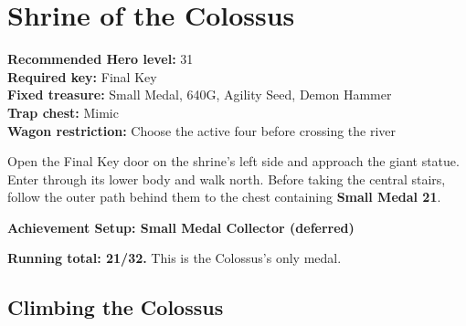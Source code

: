 \documentclass[
  american,
  10pt,
  letterpaper,
  oneside,
  open=any]{scrreprt}
\begin{document}
\section{Shrine of the Colossus}\label{shrine-of-the-colossus}

\textbf{Recommended Hero level:} 31\\
\textbf{Required key:} Final Key\\
\textbf{Fixed treasure:} Small Medal, 640G, Agility Seed, Demon Hammer\\
\textbf{Trap chest:} Mimic\\
\textbf{Wagon restriction:} Choose the active four before crossing the
river

Open the Final Key door on the shrine's left side and approach the giant
statue. Enter through its lower body and walk north. Before taking the
central stairs, follow the outer path behind them to the chest
containing \textbf{Small Medal 21}.

\begin{achievementsetup}

\textbf{Achievement Setup: Small Medal Collector (deferred)}

\textbf{Running total: 21/32.} This is the Colossus's only medal.

\end{achievementsetup}

\subsection{Climbing the Colossus}\label{climbing-the-colossus}
\end{document}
